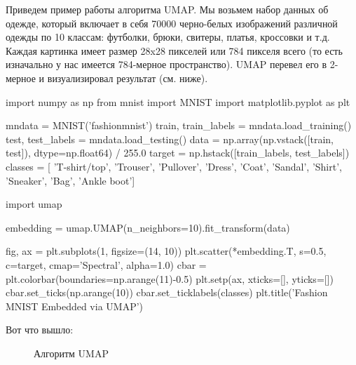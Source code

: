 \begin{itemize}
	Приведем пример работы алгоритма UMAP. Мы возьмем набор данных об одежде, который включает в себя 70000 черно-белых изображений различной одежды по 10 классам: футболки, брюки, свитеры, платья, кроссовки и т.д. Каждая картинка имеет размер 28x28 пикселей или 784 пикселя всего (то есть изначально у нас имеется 784-мерное пространство). UMAP перевел его в 2-мерное и визуализировал результат (см. ниже).
	
	\begin{listing}[1]{1}
import numpy as np
from mnist import MNIST
import matplotlib.pyplot as plt
		
mndata = MNIST('fashionmnist')
train, train_labels = mndata.load_training()
test, test_labels = mndata.load_testing()
data = np.array(np.vstack([train, test]), dtype=np.float64) / 255.0
target = np.hstack([train_labels, test_labels])
classes = [
	'T-shirt/top',
	'Trouser',
	'Pullover',
	'Dress',
	'Coat',
	'Sandal',
	'Shirt',
	'Sneaker',
	'Bag',
	'Ankle boot']
			
import umap

embedding = umap.UMAP(n_neighbors=10).fit_transform(data)
		
fig, ax = plt.subplots(1, figsize=(14, 10))
plt.scatter(*embedding.T, s=0.5, c=target, cmap='Spectral', alpha=1.0)
cbar = plt.colorbar(boundaries=np.arange(11)-0.5)
plt.setp(ax, xticks=[], yticks=[])
cbar.set_ticks(np.arange(10))
cbar.set_ticklabels(classes)
plt.title('Fashion MNIST Embedded via UMAP')
	\end{listing}

Вот что вышло:
\begin{figure}[bh]
	\noindent{}
	\caption{Алгоритм UMAP}
	\label{figCurves}
\end{figure}
	
\end{itemize}